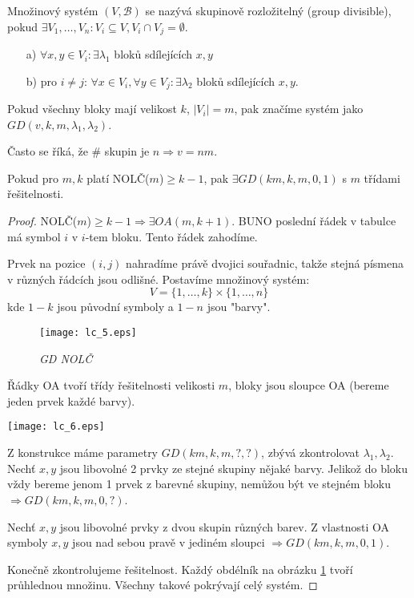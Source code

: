 \begin{definition}
    Množinový systém $(V,\mathcal{B})$ se nazývá skupinově rozložitelný (group divisible), pokud $\exists V_1,\ldots, V_n: V_i\subseteq V, V_i\cap V_j=\emptyset$.
    \begin{itemize}
        \item[a)] $\forall x,y\in V_i: \exists \lambda_1$ bloků sdílejících $x,y$
        \item[b)] pro $i\neq j$: $\forall x\in V_i, \forall y\in V_j: \exists\lambda_2$ bloků sdílejících $x,y$.
    \end{itemize}
    Pokud všechny bloky mají velikost $k$, $|V_i|=m$, pak značíme systém jako $GD(v,k,m,\lambda_1,\lambda_2)$.

	Často se říká, že \# skupin je $n \Rightarrow v = n m$.
\end{definition}
\begin{theorem}
    Pokud pro $m,k$ platí NOLČ($m$)$\geq k-1$, pak $\exists GD(km,k,m,0,1)$ s $m$ třídami řešitelnosti.
\end{theorem}
\begin{proof}
	NOLČ($m$)$\geq k-1 \Rightarrow \exists OA(m, k + 1)$.
	BUNO poslední řádek v tabulce má symbol $i$ v $i$-tem bloku.
	Tento řádek zahodíme.

	Prvek na pozice $(i, j)$ nahradíme právě dvojici souřadnic, takže stejná písmena v různých řádcích jsou odlišné.
	Postavíme množinový systém:
	\[ V = \{ 1, \ldots, k \} \times \{ 1, \ldots, n \} \]
	kde $1 - k$ jsou původní symboly a $1 - n$ jsou "barvy".

	\begin{figure}
	\texttt{[image: lc\_5.eps]}
	\caption{\small \sl GD NOLČ
	\label{fig:nolc_gd_obr}}
	\end{figure}

	Řádky OA tvoří třídy řešitelnosti velikosti $m$, bloky jsou sloupce OA (bereme jeden prvek každé barvy).

	\texttt{[image: lc\_6.eps]}

	Z konstrukce máme parametry $GD(km,k,m, ?, ?)$, zbývá zkontrolovat $\lambda_1, \lambda_2$.
	Nechť $x, y$ jsou libovolné 2 prvky ze stejné skupiny nějaké barvy.
	Jelikož do bloku vždy bereme jenom 1 prvek z barevné skupiny, nemůžou být ve stejném bloku $\Rightarrow GD(km,k,m, 0, ?)$.

	Nechť $x, y$ jsou libovolné prvky z dvou skupin různých barev.
	Z vlastnosti OA symboly $x, y$ jsou nad sebou pravě v jediném sloupci $\Rightarrow GD(km,k,m, 0, 1)$.

	Konečně zkontrolujeme řešitelnost.
	Každý obdélník na obrázku \cref{fig:nolc_gd_obr} tvoří průhlednou množinu.
	Všechny takové pokrývají celý systém.
\end{proof}
